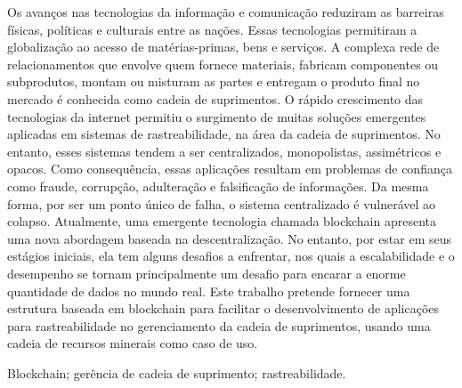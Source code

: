 
\resumo
Os avanços nas tecnologias da informação e comunicação reduziram as barreiras físicas, políticas e culturais entre as nações. Essas tecnologias permitiram a globalização ao acesso de matérias-primas, bens e serviços. A complexa rede de relacionamentos que envolve quem fornece materiais, fabricam componentes ou subprodutos, montam ou misturam as partes e entregam o produto final no mercado é conhecida como cadeia de suprimentos. O rápido crescimento das tecnologias da internet permitiu o surgimento de muitas soluções emergentes aplicadas em sistemas de rastreabilidade, na área da cadeia de suprimentos. No entanto, esses sistemas tendem a ser centralizados, monopolistas, assimétricos e opacos. Como consequência, essas aplicações resultam em problemas de confiança como fraude, corrupção, adulteração e falsificação de informações. Da mesma forma, por ser um ponto único de falha, o sistema centralizado é vulnerável ao colapso. Atualmente, uma emergente tecnologia chamada blockchain apresenta uma nova abordagem baseada na descentralização. No entanto, por estar em seus estágios iniciais, ela tem alguns desafios a enfrentar, nos quais a escalabilidade e o desempenho se tornam principalmente um desafio para encarar a enorme quantidade de dados no mundo real. Este trabalho pretende fornecer uma estrutura baseada em blockchain para facilitar o desenvolvimento de aplicações para rastreabilidade no gerenciamento da cadeia de suprimentos, usando uma cadeia de recursos minerais como caso de uso.


\begin{keywords}
Blockchain; gerência de cadeia de suprimento; rastreabilidade.
\end{keywords}


